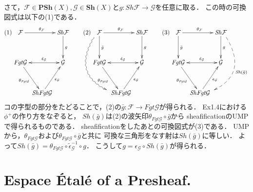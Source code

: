 \documentclass[a4paper]{jsarticle}
\newcommand{\shF}{\mathcal{F}}
\newcommand{\shG}{\mathcal{G}}
\newcommand{\Sh}{\mathbf{Sh}}
\newcommand{\PSh}{\mathbf{PSh}}
\newcommand{\ftorSh}{\mathit{Sh}}
\newcommand{\ftorFgt}{\mathit{Fgt}}
\begin{document}
    さて，$\shF \in \PSh(X), \shG \in \Sh(X)$と$g: \ftorSh \shF \to \shG$を任意に取る．
    この時の可換図式は以下の(1)である．
    \[
    (1)
    \xymatrix@C=2pt@R=35pt
    {
    \shF \ar[rr]^{\theta_{\shF}} & {} & \ftorSh \shF \ar[d]^{g} \\
    \ftorFgt \shG \ar@{<->}[rr]^-{\tilde{\epsilon}_{\shG}} \ar[rd]_-{\theta_{\ftorFgt \shG}} & {} & \shG \\
    {} & \ftorSh \ftorFgt \shG \ar[ru]_-{\epsilon_{\shG}} & {}
    }
    \hspace{20pt}
    (2)
    \xymatrix@C=2pt@R=35pt
    {
    \shF \ar[rr]^{\theta_{\shF}} \ar[d]^{\bar{g}} \ar@<-2mm>@/_12mm/@{~>}[rdd] & {} & \ftorSh \shF \ar[d]^{g} \\
    \ftorFgt \shG \ar@{<->}[rr]^-{\tilde{\epsilon}_{\shG}} \ar[rd]_-{\theta_{\ftorFgt \shG}} & {} & \shG \\
    {} & \ftorSh \ftorFgt \shG \ar[ru]_-{\epsilon_{\shG}} & {}
    }
    \hspace{20pt}
    (3)
    \xymatrix@C=2pt@R=35pt
    {
    \shF \ar[rr]^{\theta_{\shF}} \ar[d]^{\bar{g}} & {} & \ftorSh \shF \ar[d]^{g} \ar@<2mm>@/^12mm/@{-->}[ldd]^{\ftorSh(\bar{g})} \\
    \ftorFgt \shG \ar@{<->}[rr]^-{\tilde{\epsilon}_{\shG}} \ar[rd]_-{\theta_{\ftorFgt \shG}} & {} & \shG \\
    {} & \ftorSh \ftorFgt \shG \ar[ru]_-{\epsilon_{\shG}} & {}
    }
    \]
    コの字型の部分をたどることで，(2)の$\bar{g}: \shF \to \ftorFgt \shG$が得られる．
    Ex1.4における$\phi^+$の作り方をなぞると，
    $\ftorSh(\bar{g})$は(2)の波矢印$\theta_{\ftorFgt \shG} \circ \bar{g}$から
    sheafificationのUMPで得られるものである．
    sheafificationをしたあとの可換図式が(3)である．
    UMPから，$\theta_{\ftorFgt \shG}$および$\theta_{\ftorFgt \shG} \circ \bar{g}$と共に
    可換な三角形をなす射は$\ftorSh(\bar{g})$に等しい．
    よって$\ftorSh(\bar{g})=\theta_{\ftorFgt \shG} \circ \tilde{\epsilon}_{\shG}^{-1} \circ g$．
    こうして$g=\epsilon_{\shG} \circ \ftorSh(\bar{g})$が得られる．

\section{Espace \'Etal\'e of a Presheaf.} %
\end{document}
